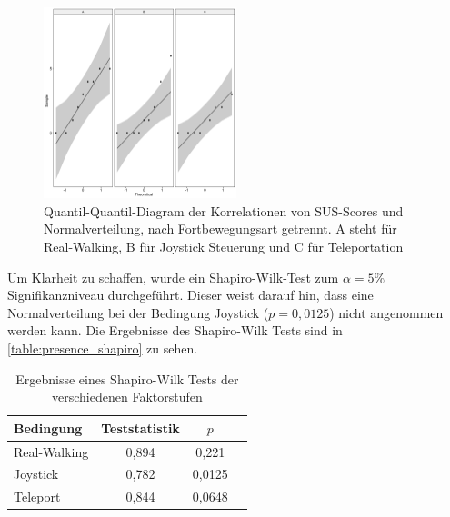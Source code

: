                     \begin{figure}[!h]
                        \centering
                        \includegraphics[width=0.5\textwidth]{plots/presence_normality.png}
                        \caption{Quantil-Quantil-Diagram der Korrelationen von SUS-Scores und Normalverteilung, nach Fortbewegungsart getrennt. A steht für Real-Walking, B für Joystick Steuerung und C für Teleportation }\label{figure:presence_normality}
                    \end{figure}

                    Um Klarheit zu schaffen, wurde ein Shapiro-Wilk-Test zum $\alpha = 5\%$ Signifikanzniveau durchgeführt. Dieser weist darauf hin, dass eine Normalverteilung bei der Bedingung Joystick ($p = 0,0125$) nicht angenommen werden kann. Die Ergebnisse des Shapiro-Wilk Tests sind in \autoref{table:presence_shapiro} zu sehen.

                    \begin{table}[!h]
                        \renewcommand\arraystretch{1.2}
                        \centering
                        \begin{tabular}{lccc} \toprule
                            Bedingung    & Teststatistik    & $p$   \\ \midrule
                            Real-Walking & 0,894            & 0,221  \\
                            Joystick     & 0,782            & 0,0125  \\
                            Teleport     & 0,844            & 0,0648  \\ \bottomrule
                        \end{tabular}
                        \caption{Ergebnisse eines Shapiro-Wilk Tests der verschiedenen Faktorstufen}\label{table:presence_shapiro}
                    \end{table}

